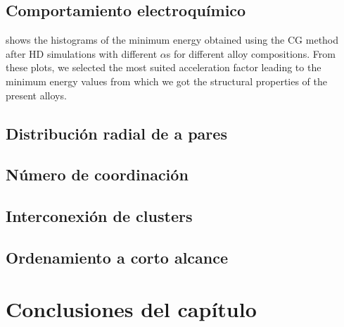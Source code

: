 \subsection{Comportamiento electroquímico}

shows the histograms of the minimum energy obtained using the CG method after HD 
simulations with different $\alpha$s for different alloy compositions. From these 
plots, we selected the most suited acceleration factor leading to the minimum 
energy values from which we got the structural properties of the present alloys. 

\subsection{Distribución radial de a pares}
\subsection{Número de coordinación}
\subsection{Interconexión de clusters}
\subsection{Ordenamiento a corto alcance}


\section{Conclusiones del capítulo}
